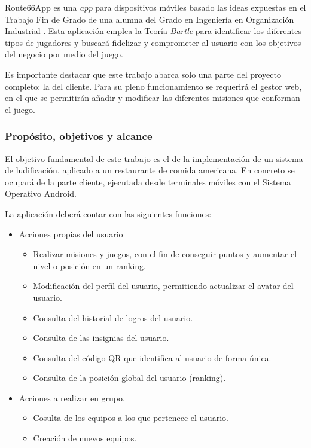 \documentclass[twoside]{report}
\begin{document}
Route66App es una \textit{app} para dispositivos móviles basado las ideas expuestas en el Trabajo Fin de Grado de una alumna del Grado en Ingeniería en Organización Industrial \cite{cristinatfg}. Esta aplicación emplea la Teoría \textit{Bartle}\cite{iebsctj} para identificar los diferentes tipos de jugadores y buscará fidelizar y comprometer al usuario con los objetivos del negocio por medio del juego.

Es importante destacar que este trabajo abarca solo una parte del proyecto completo: la del cliente. Para su pleno funcionamiento se requerirá el gestor web, en el que se permitirán añadir y modificar las diferentes misiones que conforman el juego. 
 
\subsubsection{Propósito, objetivos y alcance}

El objetivo fundamental de  este trabajo es el de la implementación de un sistema de ludificación, aplicado a un restaurante de comida americana. En concreto se ocupará de la parte cliente, ejecutada desde terminales móviles con el Sistema Operativo Android.

La aplicación deberá contar con las siguientes funciones:
\begin{itemize}
\item Acciones propias del usuario
	\begin{itemize}
	\item Realizar misiones y juegos, con el fin de conseguir puntos y aumentar el nivel o posición en un ranking.
	\item Modificación del perfil del usuario, permitiendo actualizar el avatar del usuario.
	\item Consulta del historial de logros del usuario.
	\item Consulta de las insignias del usuario.
	\item Consulta del código QR que identifica al usuario de forma única.
	\item Consulta de la posición global del usuario (ranking).
	\end{itemize}
\item Acciones a realizar en grupo.
	\begin{itemize}
	\item Cosulta de los equipos a los que pertenece el usuario.
	\item Creación de nuevos equipos.
	\end{itemize}
\end{itemize}
\end{document}
